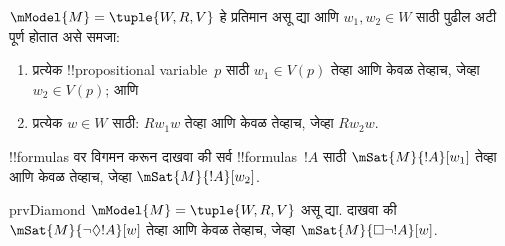 \documentclass[../../../include/open-logic-section]{subfiles}
\begin{document}
\begin{prob}
  $\mModel{M} = \tuple{W, R, V}$ हे प्रतिमान असू द्या आणि
  $w_1, w_2 \in W$ साठी पुढील अटी पूर्ण होतात असे समजा:
  \begin{enumerate}
  \item प्रत्येक !!{propositional variable}~$p$ साठी $w_1 \in V(p)$
    तेव्हा आणि केवळ तेव्हाच, जेव्हा $w_2 \in V(p)$; आणि
  \item प्रत्येक $w \in W$ साठी: $Rw_1w$ तेव्हा आणि केवळ
    तेव्हाच, जेव्हा $Rw_2w$.
  \end{enumerate}
  !!{formula}s वर विगमन करून दाखवा की सर्व !!{formula}s~$!A$
  साठी $\mSat{M}{!A}[w_1]$ तेव्हा आणि केवळ तेव्हाच,
  जेव्हा $\mSat{M}{!A}[w_2]$.
\end{prob}

\begin{probtag}{prvDiamond}
  $\mModel{M} = \tuple{W, R, V}$ असू द्या. दाखवा की
  $\mSat{M}{\lnot\Diamond !A}[w]$ तेव्हा आणि केवळ तेव्हाच,
  जेव्हा $\mSat{M}{\Box\lnot!A}[w]$.
\end{probtag}
\end{document}
